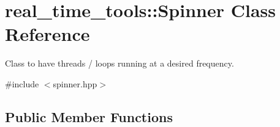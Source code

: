 \hypertarget{classreal__time__tools_1_1Spinner}{}\section{real\+\_\+time\+\_\+tools\+:\+:Spinner Class Reference}
\label{classreal__time__tools_1_1Spinner}


Class to have threads / loops running at a desired frequency.  




{\ttfamily \#include $<$spinner.\+hpp$>$}

\subsection*{Public Member Functions}
